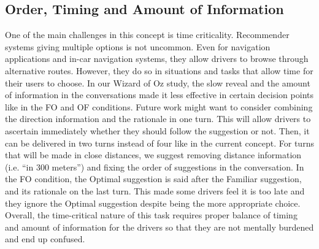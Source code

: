 \subsection{Order, Timing and Amount of Information}
One of the main challenges in this concept is time criticality. Recommender systems giving multiple options is not uncommon. Even for navigation applications and in-car navigation systems, they allow drivers to browse through alternative routes. However, they do so in situations and tasks that allow time for their users to choose. In our Wizard of Oz study, the slow reveal and the amount of information in the conversations made it less effective in certain decision points like in the FO and OF conditions. Future work might want to consider combining the direction information and the rationale in one turn. This will allow drivers to ascertain immediately whether they should follow the suggestion or not. Then, it can be delivered in two turns instead of four like in the current concept. For turns that will be made in close distances, we suggest removing distance information (i.e. ``in 300 meters'') and fixing the order of suggestions in the conversation. In the FO condition, the Optimal suggestion is said after the Familiar suggestion, and its rationale on the last turn. This made some drivers feel it is too late and they ignore the Optimal suggestion despite being the more appropriate choice. Overall, the time-critical nature of this task requires proper balance of timing and amount of information for the drivers so that they are not mentally burdened and end up confused.

